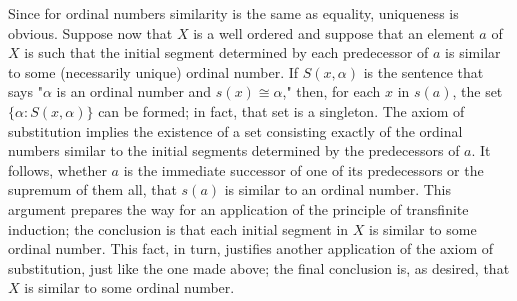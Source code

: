 \subtitle{Proof} Since for ordinal numbers similarity is the same as equality, uniqueness is obvious. Suppose now that $X$ is a well ordered and suppose that an element $a$ of $X$ is such that the initial segment determined by each predecessor of $a$ is similar to some (necessarily unique) ordinal number. If $S(x, \alpha)$ is the sentence that says "$\alpha$ is an ordinal number and $s(x) \cong \alpha$," then, for each $x$ in $s(a)$, the set $\{ \alpha : S(x, \alpha ) \}$ can be formed; in fact, that set is a singleton. The axiom of substitution implies the existence of a set consisting exactly of the ordinal numbers similar to the initial segments determined by the predecessors of $a$. It follows, whether $a$ is the immediate successor of one of its predecessors or the supremum of them all, that $s(a)$ is similar to an ordinal number. This argument prepares the way for an application of the principle of transfinite induction; the conclusion is that each initial segment in $X$ is similar to some ordinal number. This fact, in turn, justifies another application of the axiom of substitution, just like the one made above; the final conclusion is, as desired, that $X$ is similar to some ordinal number.